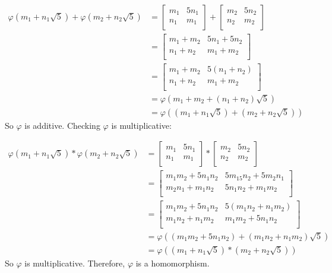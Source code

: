 \documentclass{article}
\begin{document}
\begin{align*}
\varphi(m_1 + n_1\sqrt{5}) + \varphi(m_2 + n_2\sqrt{5}) &= 
\begin{bmatrix}
	m_1 & 5n_1\\
	n_1 & m_1\\
\end{bmatrix}
+ \begin{bmatrix}
	m_2 & 5n_2\\
	n_2 & m_2\\
\end{bmatrix}\\
&= \begin{bmatrix}
	m_1 + m_2 & 5n_1 + 5n_2\\
	n_1 + n_2 & m_1 + m_2\\
\end{bmatrix}\\
&= \begin{bmatrix}
	m_1 + m_2 & 5(n_1 + n_2)\\
	n_1 + n_2 & m_1 + m_2\\
\end{bmatrix}\\
&= \varphi(m_1+m_2+(n_1+n_2)\sqrt{5})\\
&= \varphi((m_1 + n_1\sqrt{5}) + (m_2 + n_2\sqrt{5}))
\end{align*}
So \(\varphi\) is additive. Checking \(\varphi\) is multiplicative:

\begin{align*}
\varphi(m_1 + n_1\sqrt{5})*\varphi(m_2+n_2\sqrt{5}) &=
\begin{bmatrix}
	m_1 & 5n_1\\
	n_1 & m_1\\
\end{bmatrix}
* \begin{bmatrix}
	m_2 & 5n_2\\
	n_2 & m_2\\
\end{bmatrix}\\
&= \begin{bmatrix}
	m_1m_2 + 5n_1n_2 & 5m_15n_2 + 5m_2n_1\\
	m_2n_1 + m_1n_2 & 5n_1n_2 + m_1m_2\\
\end{bmatrix}\\
&= \begin{bmatrix}
	m_1m_2 + 5n_1n_2 & 5(m_1n_2 + n_1m_2)\\
	m_1n_2 + n_1m_2 & m_1m_2 + 5n_1n_2\\
\end{bmatrix}\\
&= \varphi((m_1m_2+5n_1n_2) + (m_1n_2 + n_1m_2)\sqrt{5})\\
&= \varphi((m_1 + n_1\sqrt{5}) * (m_2 + n_2\sqrt{5}))
\end{align*}
So \(\varphi\) is multiplicative. Therefore, \(\varphi\) is a homomorphism.
\end{document}
